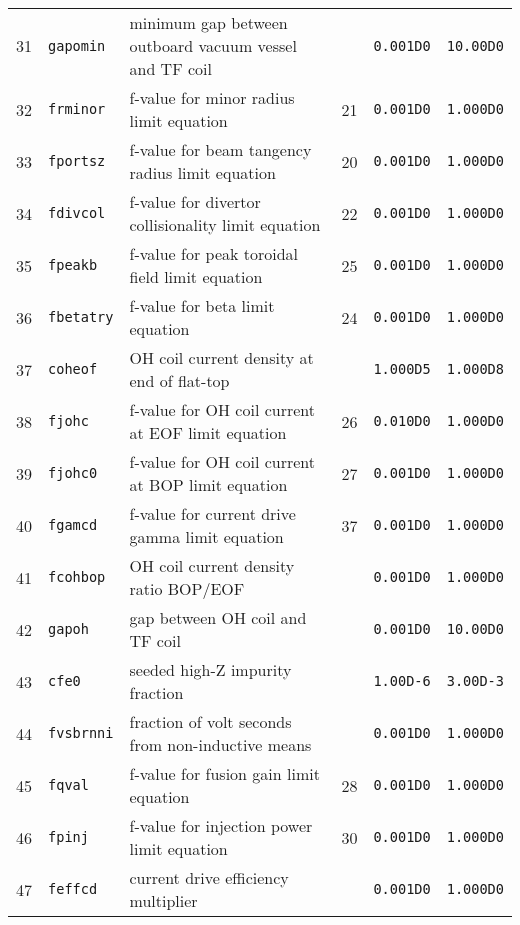 \documentclass[11pt,a4paper]{report}
\begin{document}
\begin{table}[tbph]
\begin{center}
\begin{tabular}{||c|l|l|c|c|c||}
31  & \texttt{gapomin}  & minimum gap between outboard vacuum vessel and TF coil &     & \texttt{0.001D0} & \texttt{10.00D0} \\
32  & \texttt{frminor}  & f-value for minor radius limit equation       & 21  & \texttt{0.001D0} & \texttt{1.000D0} \\
33  & \texttt{fportsz}  & f-value for beam tangency radius limit equation & 20  & \texttt{0.001D0} & \texttt{1.000D0} \\
34  & \texttt{fdivcol}  & f-value for divertor collisionality limit equation & 22  & \texttt{0.001D0} & \texttt{1.000D0} \\
35  & \texttt{fpeakb}   & f-value for peak toroidal field limit equation & 25  & \texttt{0.001D0} & \texttt{1.000D0} \\
36  & \texttt{fbetatry} & f-value for beta limit equation               & 24  & \texttt{0.001D0} & \texttt{1.000D0} \\
37  & \texttt{coheof}   & OH coil current density at end of flat-top    &     & \texttt{1.000D5} & \texttt{1.000D8} \\
38  & \texttt{fjohc}    & f-value for OH coil current at EOF limit equation & 26  & \texttt{0.010D0} & \texttt{1.000D0} \\
39  & \texttt{fjohc0}   & f-value for OH coil current at BOP limit equation & 27  & \texttt{0.001D0} & \texttt{1.000D0} \\
40  & \texttt{fgamcd}   & f-value for current drive gamma limit equation & 37  & \texttt{0.001D0} & \texttt{1.000D0} \\
41  & \texttt{fcohbop}  & OH coil current density ratio BOP/EOF         &     & \texttt{0.001D0} & \texttt{1.000D0} \\
42  & \texttt{gapoh}    & gap between OH coil and TF coil               &     & \texttt{0.001D0} & \texttt{10.00D0} \\
43  & \texttt{cfe0}     & seeded high-Z impurity fraction               &     & \texttt{1.00D-6} & \texttt{3.00D-3} \\
44  & \texttt{fvsbrnni} & fraction of volt seconds from non-inductive means &     & \texttt{0.001D0} & \texttt{1.000D0} \\
45  & \texttt{fqval}    & f-value for fusion gain limit equation        & 28  & \texttt{0.001D0} & \texttt{1.000D0} \\
46  & \texttt{fpinj}    & f-value for injection power limit equation    & 30  & \texttt{0.001D0} & \texttt{1.000D0} \\
47  & \texttt{feffcd}   & current drive efficiency multiplier           &     & \texttt{0.001D0} & \texttt{1.000D0} \\

\end{tabular}
\end{center}
\end{table}
\end{document}
